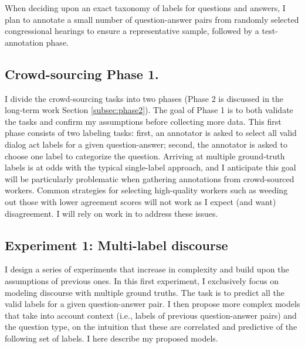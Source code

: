 
When deciding upon an exact taxonomy of labels for questions and answers, I plan to annotate a small number of question-answer pairs from randomly selected congressional hearings to ensure a representative sample, followed by a test-annotation phase. 

\subsection{Crowd-sourcing Phase 1.}
I divide the crowd-sourcing tasks into two phases (Phase 2 is discussed in the long-term work Section \ref{subsec:phase2}). The goal of Phase 1 is to both validate the tasks and confirm my assumptions before collecting more data. This first phase consists of two labeling tasks: first, an annotator is asked to select all valid dialog act labels for a given question-answer; second, the annotator is asked to choose one label to categorize the question. Arriving at multiple ground-truth labels is at odds with the typical single-label approach, and I anticipate this goal will be particularly problematic when gathering annotations from crowd-sourced workers. Common strategies for selecting high-quality workers such as weeding out those with lower agreement scores will not work as I expect (and want) disagreement. I will rely on work in \citet{Dumitrache:2018} to address these issues.

\subsection{Experiment 1: Multi-label discourse} 
I design a series of experiments that increase in complexity and build upon the assumptions of previous ones. In this first experiment, I exclusively focus on modeling discourse with multiple ground truths. The task is to predict all the valid labels for a given question-answer pair. I then propose more complex models that take into account context (i.e., labels of previous question-answer pairs) and the question type, on the intuition that these are correlated and predictive of the following set of labels. I here describe my proposed models.

